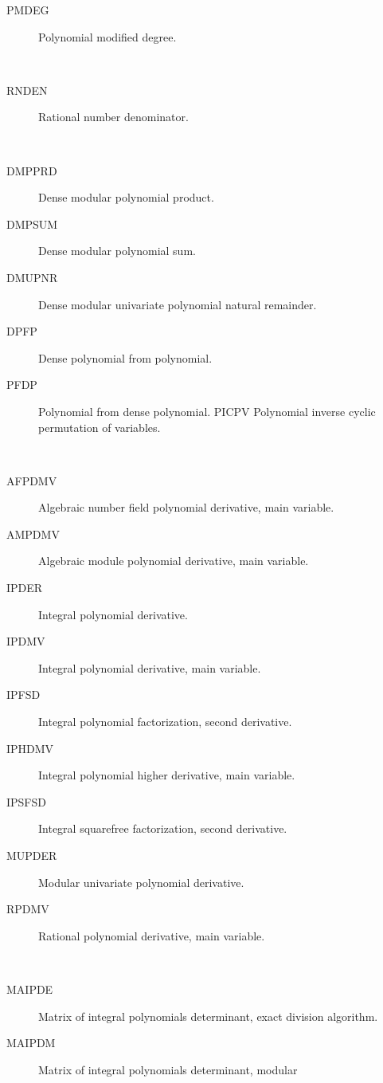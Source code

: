 \begin{description}
\begin{description}
  \item[PMDEG]  Polynomial modified degree.
  \end{description}
\item[denominator] \ \ 
  \begin{description}
  \item[RNDEN]  Rational number denominator.
  \end{description}
\item[dense] \ \ 
  \begin{description}
  \item[DMPPRD]  Dense modular polynomial product.
  \item[DMPSUM]  Dense modular polynomial sum.
  \item[DMUPNR]  Dense modular univariate polynomial natural remainder.
  \item[DPFP]  Dense polynomial from polynomial.
  \item[PFDP]  Polynomial from dense polynomial. PICPV Polynomial inverse
    cyclic permutation of variables.
  \end{description}
\item[derivative] \ \ 
  \begin{description}
  \item[AFPDMV]  Algebraic number field polynomial derivative, main variable.
  \item[AMPDMV]  Algebraic module polynomial derivative, main variable.
  \item[IPDER]  Integral polynomial derivative.
  \item[IPDMV]  Integral polynomial derivative, main variable.
  \item[IPFSD]  Integral polynomial factorization, second derivative.
  \item[IPHDMV]  Integral polynomial higher derivative, main variable.
  \item[IPSFSD]  Integral squarefree factorization, second derivative.
  \item[MUPDER]  Modular univariate polynomial derivative.
  \item[RPDMV]  Rational polynomial derivative, main variable.
  \end{description}
\item[determinant] \ \ 
  \begin{description}
  \item[MAIPDE]  Matrix of integral polynomials determinant, exact division
    algorithm.
  \item[MAIPDM]  Matrix of integral polynomials determinant, modular

\end{description}
\end{description}
